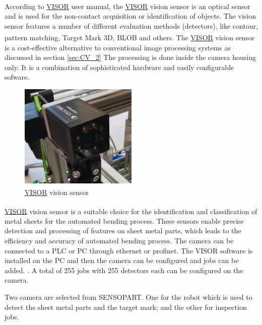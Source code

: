 According to \hyperref[acro:VISOR]{VISOR}\textsuperscript{\textregistered} \cite[page 22]{visor_user_manual} user manual, the \hyperref[acro:VISOR]{VISOR}\textsuperscript{\textregistered} vision sensor is an optical sensor and is used for the non-contact acquisition or identification of objects.
The vision sensor features a number of different evaluation methods (detectors), like contour, pattern matching, Target Mark 3D, BLOB and others.
The \hyperref[acro:VISOR]{VISOR}\textsuperscript{\textregistered} vision sensor is a cost-effective alternative to conventional image processing systems as discussed in
section \ref{sec:CV_2} The processing is done inside the camera housing only. It is a combination of sophisticated hardware and easily configurable sofware. \cite{sensopart-visor}
\begin{figure}[h]
    \centering
    \includegraphics[width=0.5\textwidth]{figures/vision-sensor.png}
    \caption{\hyperref[acro:VISOR]{VISOR}\textsuperscript{\textregistered} vision sensor}
    \label{fig:vision-sensor}
\end{figure}

\hyperref[acro:VISOR]{VISOR}\textsuperscript{\textregistered} vision sensor is a suitable choice for the identification and classification of metal sheets for the automated bending process.
These sensors enable precise detection and processing of features on sheet metal parts, which leads to the efficiency and accuracy of automated bending process.
The camera can be connected to a PLC or PC through ethernet or profinet. The VISOR software is installed on the PC and then the camera can be configured and jobs can be added.
\cite{sensopart-software}. A total of 255 jobs with 255 detectors each can be configured on the camera.

Two camera are selected from SENSOPART. One for the robot which is used to detect the sheet metal parts and the target mark; and the other for inspection jobs.

